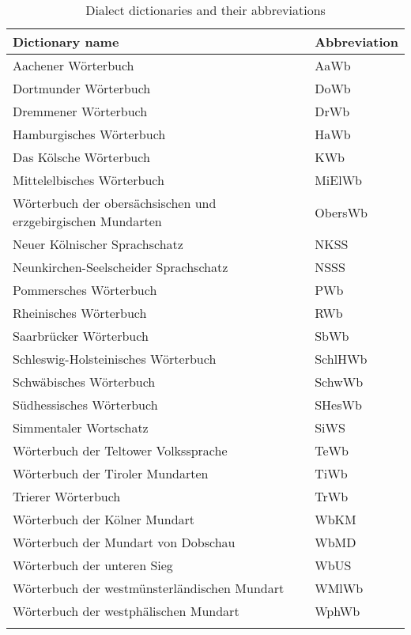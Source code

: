 \begin{table}[p]
\caption{\label{tab:1:1.2}Dialect dictionaries and their abbreviations}
\begin{tabularx}{\textwidth}{Ql}
\lsptoprule
Dictionary name & Abbreviation\\\midrule
Aachener Wörterbuch & AaWb\\
Dortmunder Wörterbuch & DoWb\\
Dremmener Wörterbuch & DrWb\\
Hamburgisches Wörterbuch & HaWb\\
Das Kölsche Wörterbuch & KWb\\
Mittelelbisches Wörterbuch & MiElWb\\
Wörterbuch der obersächsischen und erzgebirgischen Mundarten & ObersWb\\
Neuer Kölnischer Sprachschatz & NKSS\\
Neunkirchen-Seelscheider Sprachschatz & NSSS\\
Pommersches Wörterbuch & PWb\\
Rheinisches Wörterbuch & RWb\\
Saarbrücker Wörterbuch & SbWb\\
Schleswig-Holsteinisches Wörterbuch & SchlHWb\\
Schwäbisches Wörterbuch & SchwWb\\
Südhessisches Wörterbuch & SHesWb\\
Simmentaler Wortschatz & SiWS\\
Wörterbuch der Teltower Volkssprache & TeWb\\
Wörterbuch der Tiroler Mundarten & TiWb\\
Trierer Wörterbuch & TrWb\\
Wörterbuch der Kölner Mundart & WbKM\\
Wörterbuch der Mundart von Dobschau & WbMD\\
Wörterbuch der unteren Sieg & WbUS\\
Wörterbuch der westmünsterländischen Mundart & WMlWb\\
Wörterbuch der westphälischen Mundart & WphWb\\
\lspbottomrule
\end{tabularx}
\end{table}

